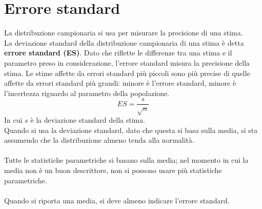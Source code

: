\documentclass[drafts, 10pt]{book}
\begin{document}
\section{Errore standard \label{errst}}
La distribuzione campionaria si usa per misurare la precisione di una stima.
\\
La deviazione standard della distribuzione campionaria di una stima è detta \textbf{errore standard (ES)}. Dato che riflette le differenze tra una stima e il parametro preso in considerazione, l'errore standard misura la precisione della stima. Le stime affette da errori standard più piccoli sono più precise di quelle affette da errori standard più grandi: minore è l'errore standard, minore è l'incertezza riguardo al parametro della popolazione. 
\begin{equation}
    ES = \frac{s}{\sqrt{n}}
\end{equation}
In cui $s$ è la deviazione standard della stima.
\\
Quando si usa la deviazione standard, dato che questa si basa sulla media, si sta assumendo che la distribuzione almeno tenda alla normalità.
\\
\\
Tutte le statistiche parametriche si basano sulla media; nel momento in cui la media non è un buon descrittore, non si possono usare più statistiche parametriche.
\\
\\
Quando si riporta una media, si deve almeno indicare l’errore standard.
\end{document}
